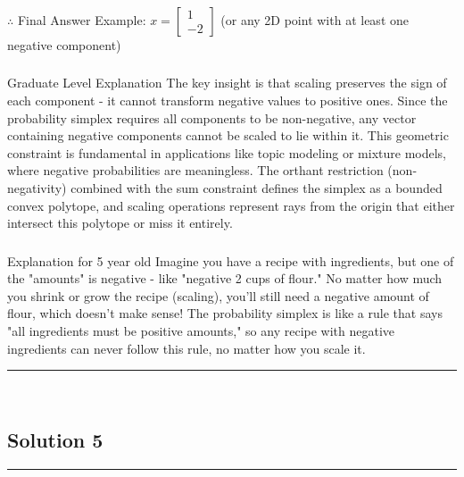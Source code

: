\documentclass{article}
\begin{document}
\subsubsection*{\normalfont}{$\therefore$ Final Answer}
Example: $x = \begin{bmatrix} 1 \\ -2 \end{bmatrix}$ (or any 2D point with at least one negative component)

\subsubsection*{\normalfont}{Graduate Level Explanation}
The key insight is that scaling preserves the sign of each component - it cannot transform negative values to positive ones. Since the probability simplex requires all components to be non-negative, any vector containing negative components cannot be scaled to lie within it. This geometric constraint is fundamental in applications like topic modeling or mixture models, where negative probabilities are meaningless. The orthant restriction (non-negativity) combined with the sum constraint defines the simplex as a bounded convex polytope, and scaling operations represent rays from the origin that either intersect this polytope or miss it entirely.

\subsubsection*{\normalfont}{Explanation for 5 year old}
Imagine you have a recipe with ingredients, but one of the "amounts" is negative - like "negative 2 cups of flour." No matter how much you shrink or grow the recipe (scaling), you'll still need a negative amount of flour, which doesn't make sense! The probability simplex is like a rule that says "all ingredients must be positive amounts," so any recipe with negative ingredients can never follow this rule, no matter how you scale it.

\noindent\rule{\textwidth}{0.4pt}\\

\newpage

\subsection*{Solution 5}
\noindent\rule{\textwidth}{0.4pt}\\
\end{document}
